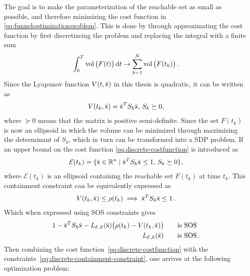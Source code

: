 The goal is to make the parameterization of the reachable set as small as
possible, and therefore minimizing the cost function in
\cref{eq:funneloptimizationproblem}. This is done by \textcite{Tobenkin_2011}
through approximating the cost function by first discretizeing the problem and
replacing the integral with a finite sum
\begin{equation}
  \int_{0}^{T} \operatorname{vol}\big( F(t) \big) \, \mathrm{d}t \rightarrow \sum_{k=1}^{N} \operatorname{vol}\big( F(t_{k}) \big) \, . \label{eq:discrete-costfunction}
\end{equation}
Since the Lyapunov function \(V(t,\bar{{\mathbf{\mathsf{x}}}})\) in this thesis is quadratic,
it can be written as
\begin{equation}
  V(t_{k}, \bar{{\mathbf{\mathsf{x}}}}) = {\bar{{\mathbf{\mathsf{x}}}}}^{T}S_{k}\bar{{\mathbf{\mathsf{x}}}}, \, S_{k} \succeq 0,
\end{equation}
where \(\succeq 0\) means that the matrix is positive semi-definite. Since the
set \(F(t_{k})\) is now an ellipsoid in which the volume can be minimized
through maximizing the determinant of \(S_{k}\), which in turn can be
transformed into a \ac{SDP} problem. If an upper bound on the cost
function \cref{eq:discrete-costfunction} is introduced as
\begin{equation}
  \mathcal{E} (t_{k}) = \lbrace\bar{{\mathbf{\mathsf{x}}}} \in \mathbb{R}^n \mid {\bar{{\mathbf{\mathsf{x}}}}}^{T}S_{k}\bar{{\mathbf{\mathsf{x}}}} \leq 1, \, S_{k} \succeq 0\rbrace,
\end{equation}
where \( \mathcal{E} ( t_{k} ) \) is an ellipsoid containing the reachable set
\( F ( t_{k} ) \) at time \( t_{k} \). This containment constraint can be
equivalently expressed as
\begin{equation}
  V ( t_{k}, \bar{{\mathbf{\mathsf{x}}}} ) \leq \rho(t_{k})  \implies {\bar{{\mathbf{\mathsf{x}}}}}^{T}S_{k}\bar{{\mathbf{\mathsf{x}}}} \leq 1 \, .
  \label{eq:discrete-containment-constraint}
\end{equation}
Which when expressed using \ac{SOS} constraints gives
\begin{align}
  1 - {\bar{{\mathbf{\mathsf{x}}}}}^{T}S_{k}\bar{{\mathbf{\mathsf{x}}}} - L_{\mathcal{E},k}(\bar{{\mathbf{\mathsf{x}}}}) \big( \rho(t_{k}) - V(t_{k}, \bar{{\mathbf{\mathsf{x}}}}) \big)  \qquad \text{is SOS}& \\
  L_{\mathcal{E},k}(\bar{{\mathbf{\mathsf{x}}}}) \qquad \text{is SOS}& \, . \nonumber
\end{align}
%
Then combining the cost function~\eqref{eq:discrete-costfunction} with the
constraints~\eqref{eq:discrete-containment-constraint}, one arrives at the
following optimization problem:
%
